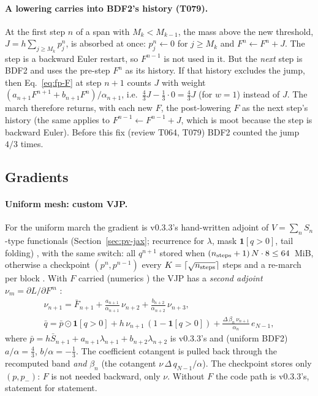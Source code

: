 \paragraph{A lowering carries into BDF2's history (T079).} At the first step $n$ of a span with $M_k<M_{k-1}$,
the mass above the new threshold, $J=h\sum_{j\ge M_k}p^n_j$, is absorbed at once: $p^n_j\leftarrow0$ for $j\ge M_k$
and $F^n\leftarrow F^n+J$. The step is a backward Euler restart, so $F^{n-1}$ is not used in it. But the \emph{next}
step is BDF2 and uses the pre-step $F^{n}$ as its history. If that history excludes the jump, then Eq.~\eqref{eq:fp-F}
at step $n+1$ counts $J$ with weight $(a_{n+1}F^{n+1}+b_{n+1}F^n)/\alpha_{n+1}$, i.e.\ $\tfrac43J-\tfrac13\cdot0=\tfrac43J$
(for $w=1$) instead of $J$. The march therefore returns, with each new $F$, the post-lowering $F$ as the next step's
history  (the same applies to $F^{n-1}\leftarrow F^{n-1}+J$,
which is moot because the step is backward Euler). Before this fix (review T064, T079) BDF2 counted the jump $4/3$
times.

\subsection{Gradients}\label{sec:fp-grad}

\paragraph{Uniform mesh: custom VJP.} For the uniform march the gradient is v0.3.3's hand-written adjoint of
$V=\sum_nS_n$-type functionals (Section~\ref{sec:pv-jax}; recurrence for $\lambda$, mask $\mathbf1[q>0]$, tail
folding) , with the same switch: all $q^{n+1}$ stored when
$(n_{\rm steps}+1)\,N\cdot8\le64$~MiB, otherwise a checkpoint $(p^n,p^{n-1})$ every
$K=\lceil\sqrt{n_{\rm steps}}\rceil$ steps and a re-march per block .
With $F$ carried (numerics ) the VJP has a \emph{second adjoint} $\nu_m=\partial L/\partial F^m$
:
\begin{equation}\begin{gathered}
  \nu_{n+1}=\bar F_{n+1}+\frac{a_{n+1}}{\alpha_{n+1}}\,\nu_{n+2}+\frac{b_{n+2}}{\alpha_{n+2}}\,\nu_{n+3},\\
  \bar q=\bar p\odot\mathbf 1[q>0]+h\,\nu_{n+1}\,(1-\mathbf 1[q>0])+\frac{\Delta\,\beta_n\,\nu_{n+1}}{\alpha_n}\,e_{N-1},
\end{gathered}\end{equation}
where $\bar p=h\bar S_{n+1}+a_{n+1}\lambda_{n+1}+b_{n+2}\lambda_{n+2}$ is v0.3.3's and (uniform BDF2)
$a/\alpha=\tfrac43$, $b/\alpha=-\tfrac13$. The coefficient cotangent is pulled back through the recomputed band
\emph{and} $\beta_n$ (the cotangent $\nu\,\Delta\,q_{N-1}/\alpha$). The checkpoint stores only $(p,p_{-})$: $F$ is not
needed backward, only $\nu$. Without $F$ the code path is v0.3.3's, statement for statement.

